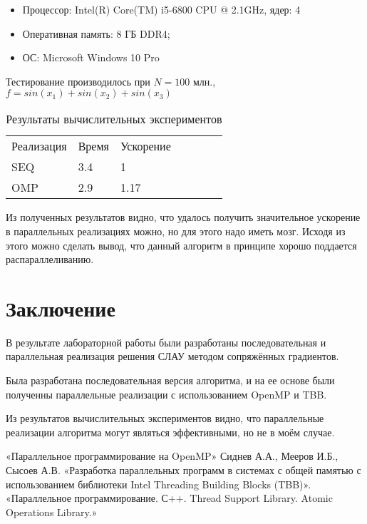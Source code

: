 \documentclass{report}
\begin{document}
 \begin{itemize}
 \item Процессор: Intel(R) Core(TM) i5-6800 CPU @ 2.1GHz, ядер: 4
 \item Оперативная память: 8 ГБ DDR4;
 \item ОС: Microsoft Windows 10 Pro
 \end{itemize}

 \par Тестирование производилось при $N=100$ млн., $f=sin(x_1)+sin(x_2)+sin(x_3)$
 \\

 \begin{table}[!h]
 \begin{center}
 \begin{tabular}{lllllll}
 Реализация & Время & Ускорение   \\
 SEQ        & 3.4 & 1           \\
 OMP        & 2.9 & 1.17      \\

 \end{tabular}
 \end{center}
 \caption{Результаты вычислительных экспериментов}
 \centering
 \end{table}

 \par Из полученных результатов видно, что удалось получить значительное ускорение в параллельных реализациях можно, но для этого надо иметь мозг. Исходя из этого можно сделать вывод, что данный алгоритм в принципе  хорошо поддается распараллеливанию.
 \newpage

 \section*{Заключение}
 В результате лабораторной работы были разработаны последовательная и параллельная реализация решения СЛАУ методом сопряжённых градиентов.
 \par Была разработана последовательная версия алгоритма,  и на ее основе были полученны параллельные реализации с использованием OpenMP и TBB.
 \par Из результатов вычислительных экспериментов видно, что параллельные реализации алгоритма могут являться эффективными, но не в моём случае.
 \newpage

 \begin{thebibliography}{1}
 \bibitem{} «Параллельное программирование на OpenMP»
  Сиднев А.А., Мееров И.Б., Сысоев А.В. «Разработка параллельных программ в системах с общей памятью с использованием библиотеки Intel Threading Building Blocks (TBB)».
 \bibitem{} «Параллельное программирование. С++. Thread Support Library. Atomic Operations Library.»
 \end{thebibliography}
 \newpage
\end{document}
